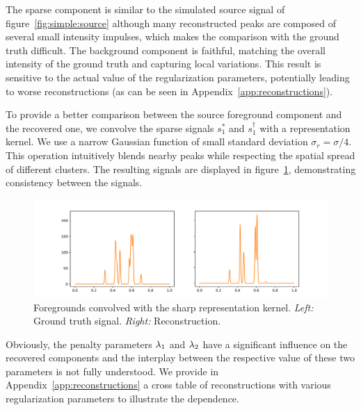 \documentclass[12pt]{article}
\begin{document}
        The sparse component is similar to the simulated source signal of figure~\ref{fig:simple:source} although many reconstructed peaks are composed of several small intensity impulses, which makes the comparison with the ground truth difficult. The background component is faithful, matching the overall intensity of the ground truth and capturing local variations. 
        This result is sensitive to the actual value of the regularization parameters, potentially leading to worse reconstructions (as can be seen in Appendix~\ref{app:reconstructions}).

        To provide a better comparison between the source foreground component and the recovered one, we convolve the sparse signals $s_1^*$ and $s_1^\dagger$ with a representation kernel. We use a narrow Gaussian function of small standard deviation $\sigma_r = \sigma/4$. This operation intuitively blends nearby peaks while respecting the spatial spread of different clusters. The resulting signals are displayed in figure~\ref{fig:simple:recos-conv}, demonstrating consistency between the signals.
        
        \begin{figure}[t]
            \centering
            \includegraphics[width=\linewidth]{figures/simple_reco/recos_conv.pdf}        
            \caption{Foregrounds convolved with the sharp representation kernel. \textit{Left:} Ground truth signal. \textit{Right:} Reconstruction.}
            \label{fig:simple:recos-conv}
        \end{figure}

        Obviously, the penalty parameters $\lambda_{1}$ and $\lambda_{2}$ have a significant influence on the recovered components and the interplay between the respective value of these two parameters is not fully understood. We provide in Appendix~\ref{app:reconstructions} a cross table of reconstructions with various regularization parameters to illustrate the dependence. 
        
\end{document}
